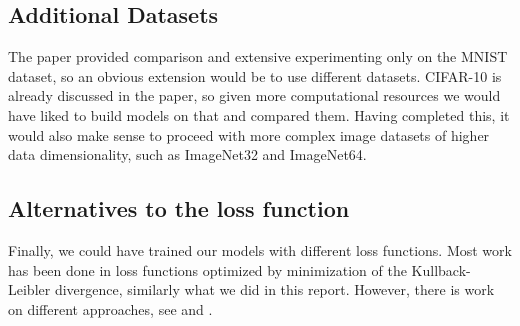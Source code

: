 
\subsection{Additional Datasets}
The paper provided comparison and extensive experimenting only on the MNIST dataset, so an obvious extension would be to use different datasets. CIFAR-10 is already discussed in the paper, so given more computational resources we would have liked to build models on that and compared them. Having completed this, it would also make sense to proceed with more complex image datasets of higher data dimensionality,  such as ImageNet32 and ImageNet64.


\subsection{Alternatives to the loss function}
Finally, we could have trained our models with different loss functions. Most work has been done in loss functions optimized by minimization of the Kullback-Leibler divergence, similarly what we did in this report. However, there is work on different approaches, see \cite{flow_gan} and \cite{wass}.